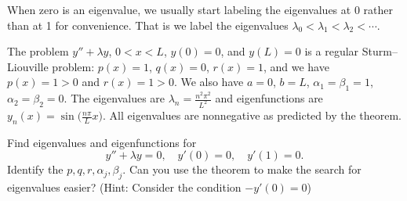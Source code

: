 When zero
is an eigenvalue, we usually
start labeling the eigenvalues at 0 rather than at 1 for convenience.
That is we label the eigenvalues $\lambda_0 < \lambda_1 < \lambda_2 < \cdots$.

\begin{example}
The problem $y''+\lambda y$, $0 < x < L$, $y(0) = 0$, and $y(L) = 0$
is a regular Sturm--Liouville problem:  $p(x) = 1$, $q(x) = 0$, $r(x) = 1$,
and we have $p(x) = 1 > 0$ and $r(x) = 1 > 0$.  We also have
$a=0$, $b=L$, $\alpha_1 = \beta_1 = 1$, $\alpha_2 = \beta_2 = 0$.
The eigenvalues are $\lambda_n = \frac{n^2 \pi^2}{L^2}$ and eigenfunctions
are $y_n(x) = \sin\bigl(\frac{n\pi}{L} x\bigr)$.  All eigenvalues are nonnegative as
predicted by the theorem.
\end{example}

\begin{exercise}
Find eigenvalues and eigenfunctions for
\begin{equation*}
y'' + \lambda y = 0, \quad y'(0) = 0, \quad y'(1) = 0.
\end{equation*}
Identify
the $p, q, r, \alpha_j, \beta_j$.
Can you use the theorem to make the search for eigenvalues easier?
(Hint: Consider the condition $-y'(0)=0$)
\end{exercise}


